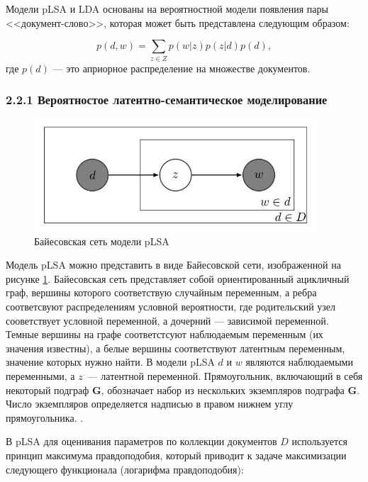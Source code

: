 \documentclass[a4paper]{report}
\begin{document}
	Модели pLSA и LDA основаны на вероятностной модели появления пары <<документ-слово>>,  которая может быть представлена следующим образом:
	
	\begin{equation}
	p(d,w) = \sum_{z \in Z}p(w|z) p(z|d) p(d),
	\label{eq:pmodel}
	\end{equation}
	где $p(d)$ --- это априорное распределение на множестве документов.
	
	
	
	
	
	\subsubsection{2.2.1 Вероятностое латентно-семантическое моделирование}
	\begin{figure}[h]
		\centering
		\includegraphics[width=400px]
		{imgs/PLSA.jpg}
		\caption{Байесовская сеть модели pLSA}
		\label{fig:plsa}
	\end{figure} 
	Модель pLSA можно представить в виде Байесовской сети, изображенной на рисунке \ref{fig:plsa}. Байесовская сеть представляет собой ориентированный ацикличный граф, вершины которого соответствую случайным переменным, а ребра соответсвуют распределениям условной вероятности, где родительский узел сооветствует условной переменной, а дочерний --- зависимой переменной. Темные вершины на графе соответстсуют наблюдаемым переменным (их значения известны), а белые вершины соответствуют латентным переменным, значение которых нужно найти. В модели pLSA  $d$  и $w$ являются наблюдаемыми переменными, а $z$~--- латентной переменной.  Прямоугольник, включающий в себя некоторый подграф $\mathbf{G}$, обозначает набор из нескольких экземпляров подграфа $\mathbf{G}$. Число экземпляров определяется надписью в правом нижнем углу прямоугольника.
	\cite{bib:Heinrich}. 
	
	В pLSA для оценивания параметров по коллекции документов $D$ используется принцип максимума правдоподобия, который приводит к задаче максимизации следующего функционала (логарифма правдоподобия):
	
\end{document}
